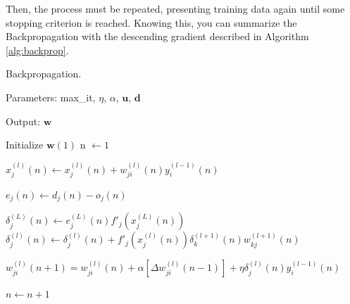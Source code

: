 Then, the process must be repeated, presenting training data again until some stopping criterion is reached. Knowing this, you can summarize the Backpropagation with the descending gradient described in Algorithm \ref{alg:backprop}.

\begin{algorithm}[h!]
    \caption{Backpropagation. \label{alg:backprop}}
    
    Parameters: max\_it, $\eta$, $\alpha$, $\mathbf{u}$, $\mathbf{d}$
    
    Output: $\mathbf{w}$
    
    \begin{algorithmic}[1] 
        \STATE Initialize $\mathbf{w}(1)$
        \STATE n $\leftarrow 1$


                
                        \STATE $x_j^{(l)}(n) \leftarrow x_j^{(l)}(n) + w_{ji}^{(l)}(n) y_i^{(l-1)}(n)$ 
                    \ENDFOR

                    \STATE $e_j (n) \leftarrow d_j(n) - o_j (n)$ 
                \ENDFOR
            
            \ENDFOR

                        \STATE $ \delta_j^{(L)} (n) \leftarrow e_j^{(L)}(n) {f}'_j (x_j^{(L)}(n)) $ 
                    \ELSE
                            \STATE $ \delta_j^{(l)} (n) \leftarrow \delta_j^{(l)} (n) + {f}'_j (x_j^{(l)}(n)) \delta_k^{(l+1)} (n) w_{kj}^{(l+1)}(n) $ 
                        \ENDFOR
                    \ENDIF

                        \STATE $w_{ji}^{(l)} (n+1) = w_{ji}^{(l)}(n) + \alpha[\Delta w_{ji}^{(l)}(n-1)] + \eta \delta_j^{(l)}(n) y_i^{(l-1)} (n)$ 
                    \ENDFOR
                \ENDFOR

            \ENDFOR

            \STATE $n \leftarrow n + 1 $

        \ENDWHILE
    \end{algorithmic}
\end{algorithm}

